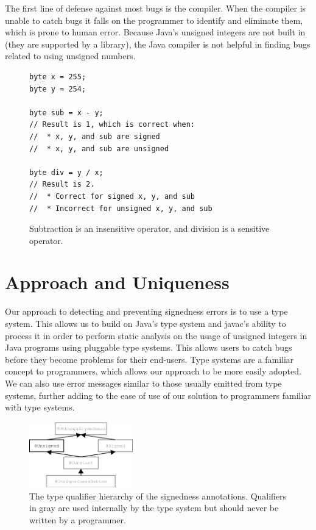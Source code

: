 \documentclass{sig-alternate-05-2015}
\begin{document}
The first line of defense against most bugs is the compiler. When the
compiler is unable to catch bugs it falls on the programmer to identify and
eliminate them, which is prone to human error. Because Java's unsigned
integers are not built in (they are supported by a library), the Java
compiler is not helpful in finding bugs related to using unsigned
numbers.

\begin{figure}
\smaller
\begin{lstlisting}
byte x = 255;
byte y = 254;

byte sub = x - y;
// Result is 1, which is correct when:
//  * x, y, and sub are signed
//  * x, y, and sub are unsigned

byte div = y / x;
// Result is 2.
//  * Correct for signed x, y, and sub
//  * Incorrect for unsigned x, y, and sub
\end{lstlisting}
\caption{Subtraction is an insensitive operator, and
  division is a sensitive operator.}
\label{fig:operators}
\end{figure}


\section{Approach and Uniqueness}

Our approach to detecting and preventing signedness errors is to use a type system. This allows us to build on Java's type system and javac's ability to process it in order to perform static analysis on the usage of unsigned integers in Java programs using pluggable type systems. This allows users to catch bugs before they become problems for their end-users. Type systems are a familiar concept to programmers, which allows our approach to be more easily adopted. We can also use error messages similar to those usually emitted from type systems, further adding to the ease of use of our solution to programmers familiar with type systems.

\begin{figure}
    \centering
    \includegraphics[width=0.4\textwidth]{unsignedness}
    \caption{The type qualifier hierarchy of the signedness annotations.
Qualifiers in gray are used internally by the type system but should never be written by a programmer.}
    \label{fig:my_label}
\end{figure}
\end{document}
